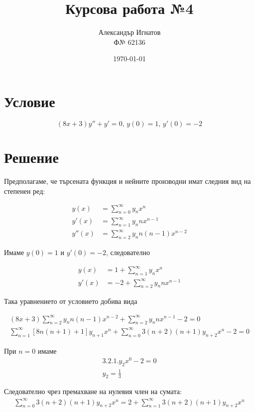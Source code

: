 \documentclass{article}
\title{Курсова работа №4}
\author{Александър Игнатов \\ Ф№ 62136 }
\date{\today}
\begin{document}
\maketitle

\section*{Условие}

\[
    (8x+3)y'' + y' = 0,\, y(0) = 1,\, y'(0) = -2
\]

\section*{Решение}

Предполагаме, че търсената функция и нейните производни имат следния вид на степенен ред:

\begin{align*}
    y(x)   &= \sum_{n=0}^{\infty} y_n x^n \\
    y'(x)  &= \sum_{n=1}^{\infty} y_n n x^{n-1} \\
    y''(x) &= \sum_{n=2}^{\infty} y_n n(n-1) x^{n-2}
\end{align*}

Имаме \( y(0) = 1 \) и \( y'(0) = -2 \), следователно

\begin{align*}
    y(x)  &= 1 + \sum_{n=1}^{\infty} y_n x^n \\
    y'(x) &= -2 + \sum_{n=2}^{\infty} y_n n x^{n-1}
\end{align*}

Така уравнението от условието добива вида

\begin{gather*}
    (8x+3)\sum_{n=2}^\infty y_n n(n-1)x^{n-2} + \sum_{n=2} ^\infty y_n n x^{n-1} - 2 = 0 \\
    \sum_{n=1}^\infty [8n(n+1) + 1]y_{n+1}x^n + \sum_{n=0}^\infty 3(n+2)(n+1)y_{n+2}x^n - 2 = 0
\end{gather*}

При \( n = 0 \) имаме
\begin{gather*}
    3 . 2 . 1 . y_2 x^0 - 2 = 0 \\
    y_2 = \frac{1}{3}
\end{gather*}

Следователно чрез премахване на нулевия член на сумата:
\begin{gather*}
    \sum_{n=0}^\infty 3(n+2)(n+1)y_{n+2}x^n = 2 + \sum_{n=1}^\infty 3(n+2)(n+1)y_{n+2}x^n
\end{gather*}
\end{document}
